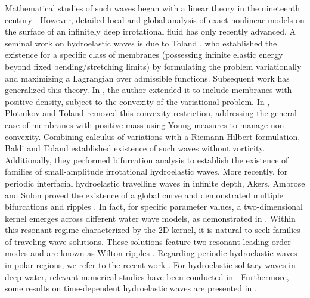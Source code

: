 \documentclass[12pt]{article}
\numberwithin{equation}{section}
\numberwithin{equation}{section}
\begin{document}
Mathematical studies of such waves began with a linear theory in the nineteenth century \cite{Greenhill}. However, detailed local and global analysis of exact nonlinear models on the surface of an infinitely deep irrotational fluid has only recently advanced. A seminal work on hydroelastic waves is due to Toland \cite{Toland1}, who established the existence for a specific class of membranes (possessing infinite elastic energy beyond fixed bending/stretching limits) by formulating the problem variationally and maximizing a Lagrangian over admissible functions. Subsequent work has generalized this theory. In \cite{Toland}, the author extended it to include membranes with positive density, subject to the convexity of the variational problem. In \cite{PlotnikovT}, Plotnikov and Toland removed this convexity restriction, addressing the general case of membranes with positive mass using Young measures to manage non-convexity. Combining calculus of variations with a Riemann-Hilbert formulation, Baldi and Toland \cite{BaldiT1} established existence of such waves without vorticity. Additionally, they performed bifurcation analysis \cite{BaldiT} to establish the existence of families of small-amplitude irrotational hydroelastic waves.  More recently, for periodic interfacial hydroelastic travelling waves in infinite depth, Akers, Ambrose and Sulon proved the existence of a global curve \cite{AkersAS} and demonstrated multiple bifurcations and ripples \cite{AkersAS1}. In fact, for specific parameter values, a two-dimensional kernel emerges across different water wave models, as demonstrated in \cite{AkersAS1,DaiXZ,EhrnstromEW}. Within this resonant regime characterized by the 2D kernel, it is natural to seek families of traveling wave solutions. These solutions feature two resonant leading-order modes and are known as Wilton ripples \cite{Wilton}. Regarding periodic hydroelastic waves in polar regions, we refer to the recent work \cite{MatiocP}. For hydroelastic solitary waves in deep water, relevant numerical studies have been conducted in \cite{GaoWM,GaoWVB,MilewshiVBW}. Furthermore, some results on time-dependent hydroelastic waves are presented in \cite{LiuA, LiuA1}.
\end{document}
